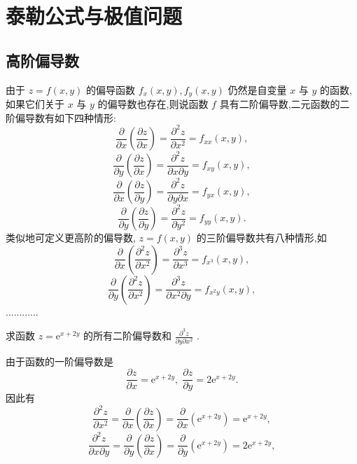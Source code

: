 \section{泰勒公式与极值问题}

\subsection{高阶偏导数}

由于 \(z = f\left( {x,y}\right)\) 的偏导函数 \({f}_{x}\left( {x,y}\right) ,{f}_{y}\left( {x,y}\right)\) 仍然是自变量 \(x\) 与 \(y\) 的函数,如果它们关于 \(x\) 与 \(y\) 的偏导数也存在,则说函数 \(f\) 具有二阶偏导数,二元函数的二阶偏导数有如下四种情形:
\[
\frac{\partial }{\partial x}\left( \frac{\partial z}{\partial x}\right)  = \frac{{\partial }^{2}z}{\partial {x}^{2}} = {f}_{xx}\left( {x,y}\right) ,
\]
\[
\frac{\partial }{\partial y}\left( \frac{\partial z}{\partial x}\right)  = \frac{{\partial }^{2}z}{\partial x\partial y} = {f}_{xy}\left( {x,y}\right) ,
\]
\[
\frac{\partial }{\partial x}\left( \frac{\partial z}{\partial y}\right)  = \frac{{\partial }^{2}z}{\partial y\partial x} = {f}_{yx}\left( {x,y}\right) ,
\]
\[
\frac{\partial }{\partial y}\left( \frac{\partial z}{\partial y}\right)  = \frac{{\partial }^{2}z}{\partial {y}^{2}} = {f}_{yy}\left( {x,y}\right) .
\]
类似地可定义更高阶的偏导数, \(z = f\left( {x,y}\right)\) 的三阶偏导数共有八种情形,如
\[
\frac{\partial }{\partial x}\left( \frac{{\partial }^{2}z}{\partial {x}^{2}}\right)  = \frac{{\partial }^{3}z}{\partial {x}^{3}} = {f}_{{x}^{3}}\left( {x,y}\right) ,
\]
\[
\frac{\partial }{\partial y}\left( \frac{{\partial }^{2}z}{\partial {x}^{2}}\right)  = \frac{{\partial }^{3}z}{\partial {x}^{2}\partial y} = {f}_{{x}^{2}y}\left( {x,y}\right) ,
\]
............

\begin{example}

\end{example}
求函数 \(z = {\mathrm{e}}^{x + {2y}}\) 的所有二阶偏导数和 \(\frac{{\partial }^{3}z}{\partial y\partial {x}^{2}}\) .

\begin{solution}

\end{solution}
由于函数的一阶偏导数是
\[
\frac{\partial z}{\partial x} = {\mathrm{e}}^{x + {2y}},\;\frac{\partial z}{\partial y} = 2{\mathrm{e}}^{x + {2y}}.
\]
因此有
\[
\frac{{\partial }^{2}z}{\partial {x}^{2}} = \frac{\partial }{\partial x}\left( \frac{\partial z}{\partial x}\right)  = \frac{\partial }{\partial x}\left( {\mathrm{e}}^{x + {2y}}\right)  = {\mathrm{e}}^{x + {2y}},
\]
\[
\frac{{\partial }^{2}z}{\partial x\partial y} = \frac{\partial }{\partial y}\left( \frac{\partial z}{\partial x}\right)  = \frac{\partial }{\partial y}\left( {\mathrm{e}}^{x + {2y}}\right)  = 2{\mathrm{e}}^{x + {2y}},
\]

